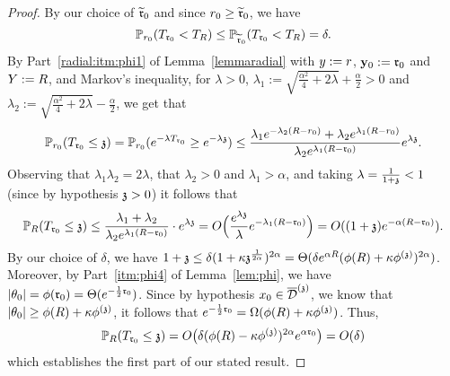 \begin{proof}
By our choice of $\widetilde{\rabs}_0$
and since $r_0\geq\widetilde{\rabs}_0$, we have 
\[
\P_{r_0}(T_{\rabs_0}<T_R) \leq \P_{\widetilde{\rabs}_0}(T_{\rabs_0}<T_R)
= \delta.
\]
By Part~\eqref{radial:itm:phi1} of Lemma~\ref{lemmaradial} with $\auxy:=r$, $\yabs_0:=\rabs_0$ and $\auxY:=R$, and Markov's inequality,
for $\lambda>0$, $\lambda_1:=\sqrt{\frac{\alpha^2}{4}+2\lambda}+\frac{\alpha}{2}>0$ and $\lambda_2:=\sqrt{\frac{\alpha^2}{4}+2\lambda}-\frac{\alpha}{2}$, we get that
\begin{equation}
\P_{r_0}(T_{\rabs_0}\leq\ss) 
= \P_{r_0}(e^{-\lambda T_{\rabs_0}}\geq e^{-\lambda\ss})\leq \frac{\lambda_1 e^{-\lambda_2(R-r_0)}+\lambda_2 e^{\lambda_1(R-r_0)}}{\lambda_2e^{\lambda_1(R-\rabs_0)}}e^{\lambda \ss}.
\label{eqn:radial-upper-aux}
\end{equation}
Observing that $\lambda_1\lambda_2=2\lambda$, that $\lambda_2>0$ and $\lambda_1>\alpha$,
and taking $\lambda=\frac{1}{1+\ss}<1$ (since by hypothesis $\ss> 0$) it follows that
\begin{equation}\label{eqn:radial-upper-aux2}
\P_{R}(T_{\rabs_0}\leq\ss) 
\leq \frac{\lambda_1+\lambda_2}{\lambda_2 e^{\lambda_1(R-\rabs_0)}}\cdot e^{\lambda\ss}
= O\Big(\frac{e^{\lambda\ss}}{\lambda}e^{-\lambda_1(R-\rabs_0)}\Big)
= O((1+\ss) e^{-\alpha(R-\rabs_0)}).
\end{equation}
By our choice of $\delta$, we have $1+\ss\leq\delta(1+\kappa\ss^{\frac{1}{2\alpha}})^{2\alpha}
=\Theta(\delta e^{\alpha R}(\phi(R)+\kappa\phi^{(\ss)})^{2\alpha})$.
Moreover, by Part~\eqref{itm:phi4} of Lemma~\ref{lem:phi}, we have 
$|\theta_0|=\phi(\rabs_0)=\Theta(e^{-\frac12\rabs_0})$.
Since by hypothesis $x_0\in\ndt$, we know that $|\theta_0|\geq\phi(R)+\kappa\phi^{(\ss)}$,
it follows that $e^{-\frac12\rabs_0}=\Omega(\phi(R)+\kappa\phi^{(\ss)})$.
Thus, 
\[
\P_{R}(T_{\rabs_0}\leq\ss) 
= O\big(\delta (\phi(R)-\kappa\phis)^{2\alpha}e^{\alpha \rabs_0}\big)=O(\delta)
\]
which establishes the first part of our stated result.


\end{proof}
